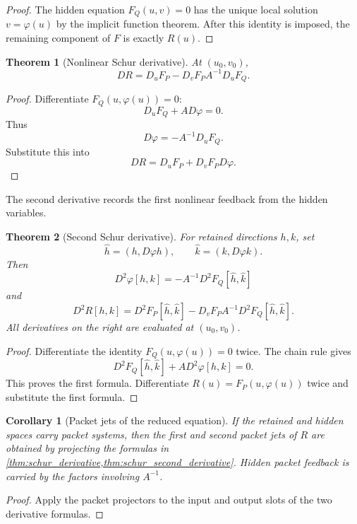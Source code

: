 \documentclass{aomart}
\newtheorem{theorem}{Theorem}[section]
\newtheorem{corollary}[corollary]{Corollary}
\theoremstyle{definition}
\theoremstyle{remark}
\begin{document}
\begin{proof}
The hidden equation $F_Q(u,v)=0$ has the unique local solution $v=\varphi(u)$ by the implicit function theorem.  After this identity is imposed, the remaining component of $F$ is exactly $R(u)$.
\end{proof}

\begin{theorem}[Nonlinear Schur derivative]\label{thm:schur_derivative}
At $(u_0,v_0)$,
\[
DR
=
D_uF_P
-
D_vF_P A^{-1}D_uF_Q.
\]
\end{theorem}

\begin{proof}
Differentiate $F_Q(u,\varphi(u))=0$:
\[
D_uF_Q+A D\varphi=0.
\]
Thus
\[
D\varphi=-A^{-1}D_uF_Q.
\]
Substitute this into
\[
DR=D_uF_P+D_vF_PD\varphi.
\]
\end{proof}

The second derivative records the first nonlinear feedback from the hidden variables.

\begin{theorem}[Second Schur derivative]\label{thm:schur_second_derivative}
For retained directions $h,k$, set
\[
\widehat h=(h,D\varphi h),
\qquad
\widehat k=(k,D\varphi k).
\]
Then
\[
D^2\varphi[h,k]
=
-A^{-1}D^2F_Q[\widehat h,\widehat k]
\]
and
\[
D^2R[h,k]
=
D^2F_P[\widehat h,\widehat k]
-
D_vF_P A^{-1}D^2F_Q[\widehat h,\widehat k].
\]
All derivatives on the right are evaluated at $(u_0,v_0)$.
\end{theorem}

\begin{proof}
Differentiate the identity $F_Q(u,\varphi(u))=0$ twice.  The chain rule gives
\[
D^2F_Q[\widehat h,\widehat k]
+A D^2\varphi[h,k]
=0.
\]
This proves the first formula.  Differentiate $R(u)=F_P(u,\varphi(u))$ twice and substitute the first formula.
\end{proof}

\begin{corollary}[Packet jets of the reduced equation]\label{cor:reduced_packet_jets}
If the retained and hidden spaces carry packet systems, then the first and second packet jets of $R$ are obtained by projecting the formulas in \cref{thm:schur_derivative,thm:schur_second_derivative}.  Hidden packet feedback is carried by the factors involving $A^{-1}$.
\end{corollary}

\begin{proof}
Apply the packet projectors to the input and output slots of the two derivative formulas.
\end{proof}
\end{document}
